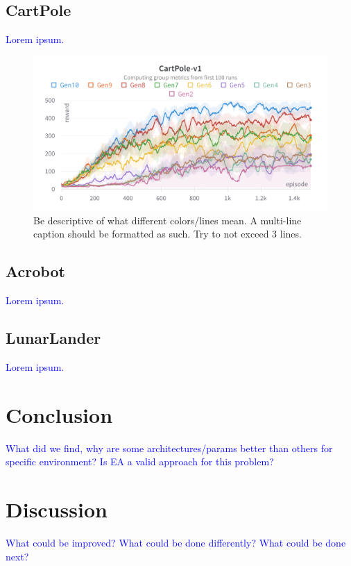 \documentclass{article}
\newcommand{\TODO}[1]{\textcolor{blue}{#1}}
\begin{document}
\subsection{CartPole}
\label{ssec:cp}

\TODO{Lorem ipsum.}

\begin{figure}[htbp]
    \centering
    \includegraphics[width=0.9\linewidth]{figs/lc-cp.png}
    \caption{
        Be descriptive of what different colors/lines mean.
        A multi-line caption should be formatted as such.
        Try to not exceed 3 lines.
    }
    \label{fig:lc-cp}
\end{figure}

\subsection{Acrobot}
\label{ssec:ab}

\TODO{Lorem ipsum.}

\subsection{LunarLander}
\label{ssec:ll}

\TODO{Lorem ipsum.}

\section{Conclusion}
\label{sec:conc}

\TODO{
    What did we find, why are some architectures/params better than others for specific environment?
    Is EA a valid approach for this problem?
}

\section{Discussion}
\label{sec:disc}

\TODO{
    What could be improved?
    What could be done differently?
    What could be done next?
}


\end{document}
